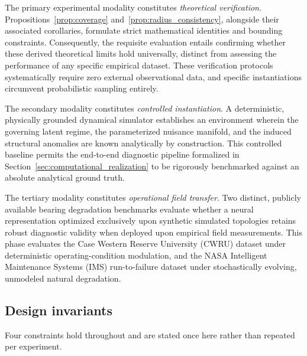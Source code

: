 \documentclass[a4paper]{cas-sc}
\begin{document}
The primary experimental modality constitutes \emph{theoretical verification}. Propositions~\ref{prop:coverage} and~\ref{prop:radius_consistency}, alongside their associated corollaries, formulate strict mathematical identities and bounding constraints. Consequently, the requisite evaluation entails confirming whether these derived theoretical limits hold universally, distinct from assessing the performance of any specific empirical dataset. These verification protocols systematically require zero external observational data, and specific instantiations circumvent probabilistic sampling entirely.

The secondary modality constitutes \emph{controlled instantiation}. A deterministic, physically grounded dynamical simulator establishes an environment wherein the governing latent regime, the parameterized nuisance manifold, and the induced structural anomalies are known analytically by construction. This controlled baseline permits the end-to-end diagnostic pipeline formalized in Section~\ref{sec:computational_realization} to be rigorously benchmarked against an absolute analytical ground truth.

The tertiary modality constitutes \emph{operational field transfer}. Two distinct, publicly available bearing degradation benchmarks evaluate whether a neural representation optimized exclusively upon synthetic simulated topologies retains robust diagnostic validity when deployed upon empirical field measurements. This phase evaluates the Case Western Reserve University (CWRU) dataset under deterministic operating-condition modulation, and the NASA Intelligent Maintenance Systems (IMS) run-to-failure dataset under stochastically evolving, unmodeled natural degradation.

\subsection{Design invariants}
\label{subsec:design_invariants}

Four constraints hold throughout and are stated once here rather than repeated
per experiment.
\end{document}
